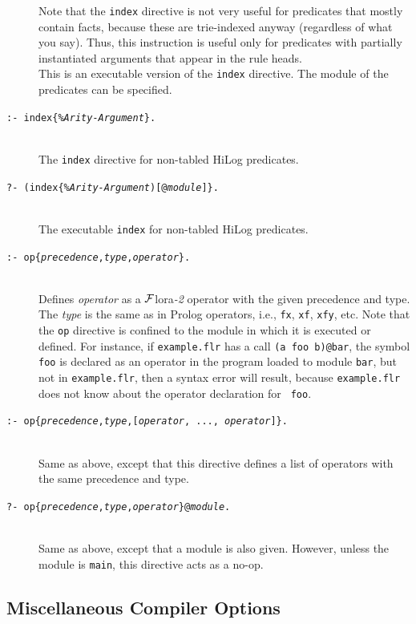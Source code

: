 \documentclass[11pt]{article}
\newcommand{\FLSYSTEM}{{\mbox{\sc ${\cal F}${lora}\rm\emph{-2}}}\xspace}
\newcommand{\flrext}{flr}
\begin{document}
\begin{description}
  Note that the {\tt index} directive is not very useful for predicates
  that mostly contain facts, because these are trie-indexed anyway
  (regardless of what you say). Thus, this instruction is useful only for
  predicates with partially instantiated arguments that appear in the rule
  heads.
~~~  \\
  This is an executable version of the {\tt index} directive.  The
  module of the predicates can be specified.
\item[\texttt{:- index\{\emph{\%Arity-Argument}\}.}]
~~~  \\
  The {\tt index} directive for non-tabled HiLog predicates.
\item[\texttt{?- (index\{\emph{\%Arity-Argument})[@\emph{module}]\}.}]
~~~  \\
  The executable {\tt index} for non-tabled HiLog predicates.

\item[\texttt{:- op\{{\it precedence},{\it type},{\it operator}\}.}]
 ~~~ \\
  Defines \emph{operator} as a \FLSYSTEM operator with the given precedence
  and type. The \emph{type} is the same as in Prolog operators, i.e.,
  {\tt fx}, {\tt xf}, {\tt xfy}, etc.
  Note that the {\tt op} directive is confined to
  the module in which it is executed or defined. For instance, if
  {\tt example.\flrext} has a call {\tt (a foo b)@bar}, the symbol {\tt foo} is
  declared as an operator in the program loaded to module {\tt bar}, but not in
  {\tt example.\flrext}, then a syntax error will result, because 
   {\tt example.\flrext} does not know about the operator declaration for {\tt
  foo}.
\item[\texttt{:- op\{{\it precedence},{\it type},[{\it operator}, ..., {\it operator}]\}.}]
~~~  \\
  Same as above, except that this directive defines a list of operators
  with the same precedence and type.
\item[\texttt{?- op\{{\it precedence},{\it type},{\it operator}\}@\emph{module}.}]
 ~~~ \\
  Same as above, except that a module is also given. However, unless the
  module is {\tt main}, this directive acts as a no-op.
\end{description}


\subsection{Miscellaneous Compiler Options}
\end{document}

